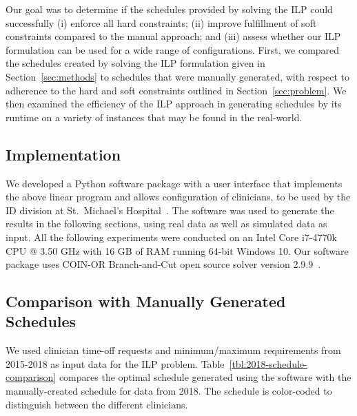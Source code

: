 Our goal was to determine if the schedules provided by solving the ILP 
could successfully
(i) enforce all hard constraints; 
(ii) improve fulfillment of soft constraints compared to the manual approach; %
and (iii) assess whether our ILP formulation can be used for a wide range
of configurations.  %
First, we compared the schedules created by solving the ILP formulation
given in Section~\ref{sec:methods} to schedules that were manually generated,
with respect to adherence to the hard and soft constraints outlined in Section~\ref{sec:problem}.
We then examined the efficiency of the ILP approach in generating schedules
by its runtime on a variety of instances that may be found in the real-world.

\subsection{Implementation}
We developed a Python software package with a user interface that implements the above
linear program and allows configuration of clinicians, to be
used by the ID division at St.\ Michael's Hospital~\cite{landsman_scheduling}. 
The software was used to
generate the results in the following sections, using real data as well as
simulated data as input. All the following experiments were conducted on an
Intel Core i7-4770k CPU @ 3.50 GHz with 16 GB of RAM running 64-bit Windows 10.
Our software package uses COIN-OR Branch-and-Cut open source solver
version 2.9.9~\cite{johnjforrest_coin-or/cbc:_2019}.

\subsection{Comparison with Manually Generated Schedules}  %
We used clinician time-off requests and minimum/maximum requirements from
2015-2018 as input data for the ILP problem.
Table~\ref{tbl:2018-schedule-comparison} compares the optimal schedule generated using
the software with the manually-created schedule for data from 2018. The
schedule is color-coded to distinguish between the different clinicians.

